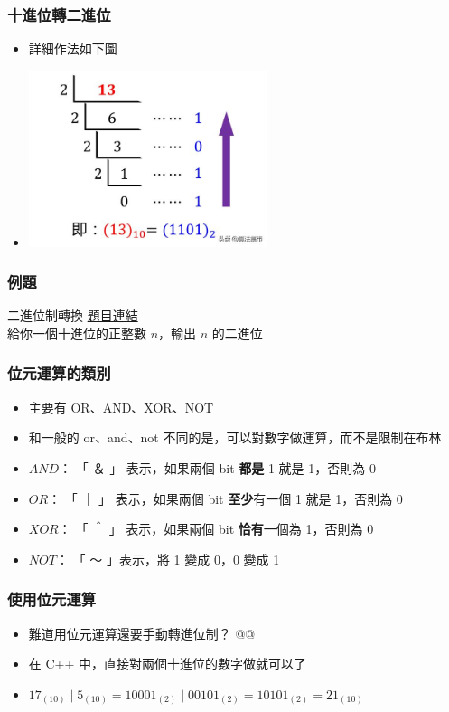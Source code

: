 \documentclass[mathserif]{beamer}
\begin{document}
\begin{frame}
    \frametitle{十進位轉二進位}
    \begin{itemize}
        \item 詳細作法如下圖
        \item \includegraphics[width=7.0cm]{img/1-1.png}
    \end{itemize}
\end{frame}

\begin{frame}
    \frametitle{例題}
    \begin{block}{二進位制轉換}
        \href{https://zerojudge.tw/ShowProblem?problemid=a034}{題目連結}\\
        給你一個十進位的正整數 $n$，輸出 $n$ 的二進位
    \end{block}
\end{frame}

\begin{frame}
    \frametitle{位元運算的類別}
    \begin{itemize}
        \item 主要有 OR、AND、XOR、NOT
        \item 和一般的 or、and、not 不同的是，可以對數字做運算，而不是限制在布林
        \vspace{0.5cm}
        \item<2-> $AND$： 「 ＆ 」 表示，如果兩個 bit \textbf{都是} 1 就是 1，否則為 0
        \item<2-> $OR$： 「 ｜ 」 表示，如果兩個 bit \textbf{至少}有一個 1 就是 1，否則為 0
        \item<2-> $XOR$： 「 ＾ 」 表示，如果兩個 bit \textbf{恰有}一個為 1，否則為 0
        \item<2-> $NOT$： 「 ～ 」表示，將 1 變成 0，0 變成 1
    \end{itemize}
\end{frame}

\begin{frame}
    \frametitle{使用位元運算}
    \begin{itemize}
        \item 難道用位元運算還要手動轉進位制？ @@
        \item<2-> 在 C++ 中，直接對兩個十進位的數字做就可以了
        \item<2-> $17_{(10)} \mid 5_{(10)} = 10001_{(2)} \mid 00101_{(2)} = 10101_{(2)} = 21_{(10)}$
    \end{itemize}
\end{frame}
\end{document}
